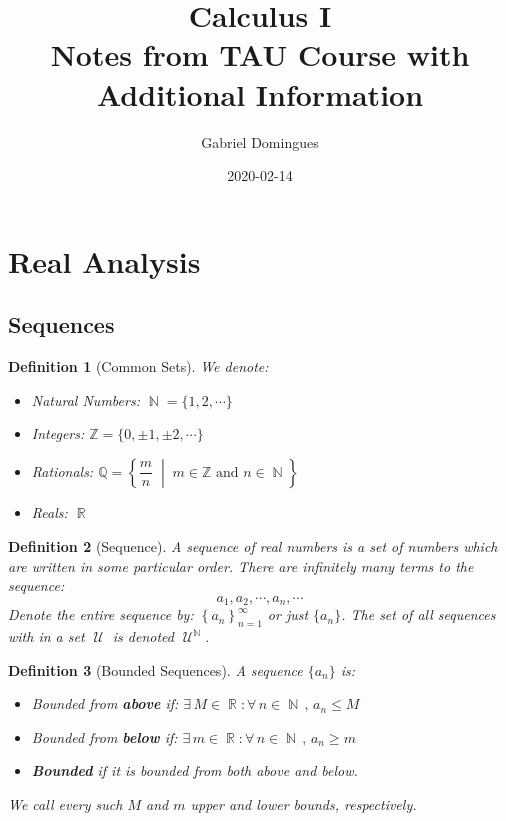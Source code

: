 \documentclass[12pt]{article}
\title{%
  Calculus I \\
  \large Notes from TAU Course with Additional Information}
\author{Gabriel Domingues}
\date{2020-02-14}
\newcommand{\set}[2]{\left\{{#1}\;\middle|\;{#2}\right\}}
\newcommand{\Forall}[1]{\forall\,{#1}\,,\,}
\newcommand{\Exist}[1]{\exists\,{#1}:}
\newcommand{\seq}[2]{\left\{{#1}\right\}_{#2 =1}^\infty}
\DeclareMathOperator{\N}{\mathbb{N}}
\DeclareMathOperator{\R}{\mathbb{R}}
\DeclareMathOperator{\U}{\mathcal{U}}
\newtheorem{definition}{Definition}[subsection]
\begin{document}
\maketitle

\setlength{\parindent}{0ex}
\setlength{\parskip}{1em}

\text{}

\tableofcontents

\pagebreak

\section{Real Analysis}

\subsection{Sequences}

\begin{definition}[Common Sets]
  We denote:
  \begin{itemize}
    \item[] Natural Numbers: $\N=\{1,2,\cdots\}$ 
    \item[] Integers: $\mathbb{Z} = \{0,\pm 1,\pm 2,\cdots\}$
    \item[] Rationals: $\mathbb{Q}=\set{\dfrac{m}{n}}{m\in\mathbb{Z}\text{ and } n\in\N}$
    \item[] Reals: $\R$
  \end{itemize}
\end{definition}

\begin{definition}[Sequence]
  A sequence of real numbers is a set of numbers which are written in some particular order. There are infinitely many terms to the sequence:
  $$a_1,a_2,\cdots,a_n,\cdots$$
  Denote the entire sequence by: $\seq{a_n}{n}$ or just $\{a_n\}$. The set of all sequences with in a set $\U$ is denoted $\U^{\N}$.
\end{definition}

\begin{definition}[Bounded Sequences]
  A sequence $\{a_n\}$ is:
  \begin{itemize}
    \item[] Bounded from \textbf{above} if: $\Exist{M\in\R}\Forall{n\in\N}a_n\leq M$
    \item[] Bounded from \textbf{below} if: $\Exist{m\in\R}\Forall{n\in\N}a_n\geq m$
    \item[] \textbf{Bounded} if it is bounded from both above and below.
  \end{itemize}
  We call every such $M$ and $m$ upper and lower bounds, respectively. 
\end{definition}
\end{document}

